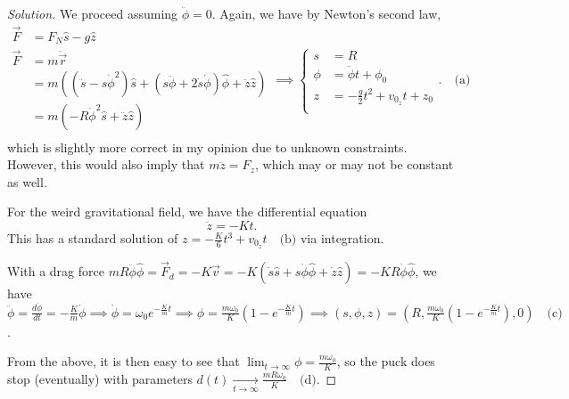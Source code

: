 \documentclass{article}
\begin{document}
\begin{proof}[Solution]
We proceed assuming $\ddot{\phi} = 0$. Again, we have by Newton's second
law,
\[ \begin{aligned}
\vec{F} &= F_N \hat{s} - g \hat{z} \\
\vec{F} &= m \ddot{\vec{r}} \\
&= m \left(\left( \ddot{s} - s \dot{\phi}^2 \right) \hat{s} + \left(s
\ddot{\phi} + 2 \dot{s} \dot{\phi}\right) \hat{\phi} + \ddot{z}
\hat{z}\right) \\
&= m\left(-R \dot{\phi}^2 \hat{s} + \ddot{z} \hat{z}\right) \\
\end{aligned} \implies \boxed{\left \lbrace \begin{aligned}
s &= R \\
\phi &= \dot{\phi} t + \phi_0 \\
z &= -\frac{g}{2} t^2 + v_{0_z} t + z_0 \\
\end{aligned} \right.}. \quad \textrm{(a)} \]
which is slightly more correct in my opinion due to unknown constraints.
However, this would also imply that $m \ddot{z} = F_z$, which may or may
not be constant as well.

For the weird gravitational field, we have the differential equation
\[ \ddot{z} = -Kt. \]
This has a standard solution of $\boxed{z = -\frac{K}{6} t^3 + v_{0_z}
t} \quad \textrm{(b)}$ via integration.

With a drag force $m R \ddot{\phi} \hat{\phi} = \vec{F}_d = -K \vec{v} =
-K (\dot{s} \hat{s} + s \dot{\phi} \hat{\phi} + \dot{z} \hat{z}) = -KR
\dot{\phi}\hat{\phi}$, we have $\ddot{\phi} = \frac{d \dot{\phi}}{dt} =
-\frac{K}{m} \dot{\phi} \implies \dot{\phi} = \omega_0 e^{-\frac{K}{m}
t} \implies \phi = \frac{m \omega_0}{K} \left(1 - e^{-\frac{K}{m}
t}\right) \implies \boxed{(s, \phi, z) = \left(R, \frac{m
\omega_0}{K}\left(1 - e^{-\frac{K}{m} t}\right), 0\right)} \quad
\textrm{(c)}$.

From the above, it is then easy to see that $\lim_{t \to \infty} \phi =
\frac{m \omega_0}{K}$, so the puck does stop (eventually) with
parameters $\boxed{d(t) \xrightarrow[t \to \infty]{} \frac{m R
\omega_0}{K}} \quad \textrm{(d)}$.
\end{proof}
\end{document}
